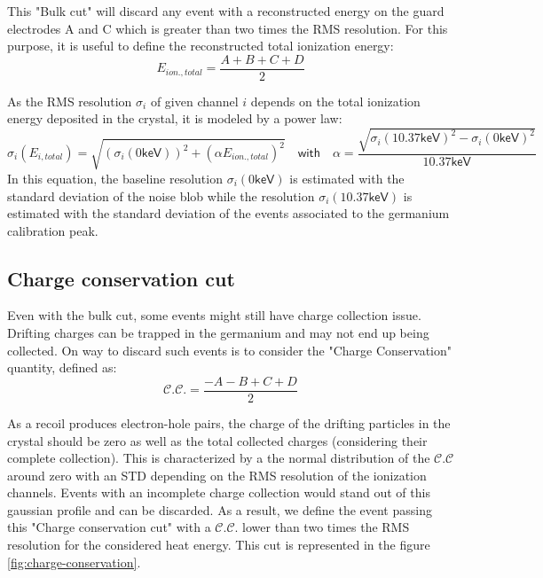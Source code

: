 This "Bulk cut" will discard any event with a reconstructed energy on the guard electrodes A and C which is greater than two times the RMS resolution.
For this purpose, it is useful to define the reconstructed total ionization energy:
\begin{equation}
E_{ion., total} = \frac{A+B+C+D}{2}
\end{equation}


As the RMS resolution $\sigma_i$ of given channel $i$ depends on the total ionization energy deposited in the crystal, it is modeled by a power law:
\begin{equation}
\sigma_i\left( E_{i, total} \right)
=
\sqrt{ 
\left( \sigma_i(0\textsf{keV}) \right)^2 + 
\left( \alpha E_{ion., total} \right)^2
}
\quad \textsf{with} \quad
\alpha = \frac{\sqrt{\sigma_i(10.37\textsf{keV})^2 - \sigma_i(0\textsf{keV})^2}}{10.37 \textsf{keV}}
\end{equation}
In this equation, the baseline resolution $\sigma_i(0\textsf{keV})$ is estimated with the standard deviation of the noise blob while the resolution $\sigma_i(10.37\textsf{keV})$ is estimated with the standard deviation of the events associated to the germanium calibration peak.

\subsection{Charge conservation cut}
\label{par:charge-conservation-cut}

Even with the bulk cut, some events might still have charge collection issue. Drifting charges can be trapped in the germanium and may not end up being collected. On way to discard such events is to consider the "Charge Conservation" quantity, defined as:
\begin{equation}
\mathcal{C.C.} = \frac{-A-B+C+D}{2}
\end{equation}

As a recoil produces electron-hole pairs, the charge of the drifting particles in the crystal should be zero as well as the total collected charges (considering their complete collection). This is characterized by a the normal distribution of the $\mathcal{C.C}$ around zero with an STD depending on the RMS resolution of the ionization channels. Events with an incomplete charge collection would stand out of this gaussian profile and can be discarded. As a result, we define the event passing this "Charge conservation cut" with a $\mathcal{C.C.}$ lower than two times the RMS resolution for the considered heat energy. This cut is represented in the figure \ref{fig:charge-conservation}.

